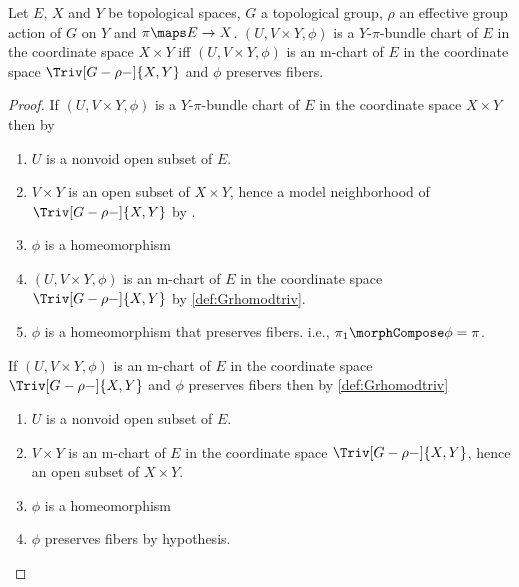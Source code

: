 \documentclass{article}
\begin{document}
\begin{lemma}
\label{lem:GrhomodtrivYpichart}
Let $E$, $X$ and $Y$ be topological spaces, $G$ a topological group,
$\rho$ an effective group action of $G$ on $Y$ and
$\pi \maps E \to X$.
$(U, V \times Y, \phi)$ is a $Y$-$\pi$-bundle chart of $E$ in
the coordinate space $X \times Y$ iff $(U, V \times Y, \phi)$ is an
m-chart of $E$ in the coordinate space $\Triv[G-\rho-]{X,Y}$ and $\phi$
preserves fibers.

\begin{proof}
If $(U, V \times Y, \phi)$ is a $Y$-$\pi$-bundle chart of $E$
in the coordinate space $X \times Y$ then by 

\begin{enumerate}
\item
$U$ is a nonvoid open subset of $E$.
\item
$V \times Y$ is an open subset of $X \times Y$, hence a model
neighborhood of $\Triv[G-\rho-]{X,Y}$ by .

\item
$\phi$ is a homeomorphism

\item
$(U, V \times Y, \phi)$ is an m-chart of $E$ in the coordinate space
$\Triv[G-\rho-]{X,Y}$ by \cref{def:Grhomodtriv}.

\item
$\phi$ is a homeomorphism that preserves fibers. i.e.,
$\pi_1 \morphCompose \phi = \pi$.
\end{enumerate}

If $(U, V \times Y, \phi)$ is an m-chart of $E$ in the coordinate space
$\Triv[G-\rho-]{X,Y}$ and $\phi$ preserves fibers then by
\cref{def:Grhomodtriv}

\begin{enumerate}
\item
$U$ is a nonvoid open subset of $E$.

\item
$V \times Y$ is an m-chart of $E$ in the coordinate space
$\Triv[G-\rho-]{X,Y}$, hence an open subset of $X \times Y$.

\item
$\phi$ is a homeomorphism

\item
$\phi$ preserves fibers by hypothesis.
\end{enumerate}
\end{proof}
\end{lemma}
\end{document}
